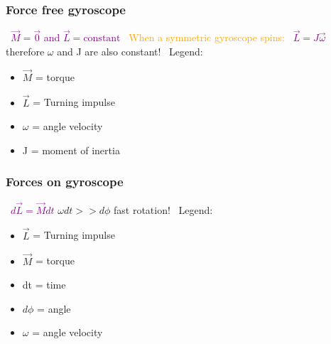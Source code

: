 \documentclass[main.tex,fontsize=8pt,paper=a4,paper=portrait,DIV=calc,]{scrartcl}
\begin{document}
\begin{multicols*}{2}
\subsubsection{Force free gyroscope}
\, \newline
\large \textcolor{purple}{\( \vec{M} = \vec{0} \) and \( \vec{L} = \text{constant} \)}\newline
\, \newline
\large \textcolor{orange}{When a symmetric gyroscope spins:}
\, \newline
\large \textcolor{purple}{\( \vec{L} = J\vec{\omega} \)}\newline
therefore \(\omega\) and J are also constant!\newline
\, \newline
\normalsize Legend: \newline
\begin{itemize}
  \item \(\vec{M}\) = torque
  \item \(\vec{L}\) = Turning impulse
\item \(\omega\) = angle velocity 
\item J = moment of inertia
\end{itemize} 

\subsubsection{Forces on gyroscope}
\, \newline
\large \textcolor{purple}{\( d\vec{L} = \vec{M}dt \)}\newline
\(\omega dt >> d\phi\) fast rotation!\newline
\, \newline
\normalsize Legend: \newline
\begin{itemize}
  \item \(\vec{L}\) = Turning impulse
  \item \(\vec{M}\) = torque
\item dt = time  
\item \(d\phi\) = angle 
\item \(\omega\) = angle velocity
\end{itemize} 


\end{multicols*}
\end{document}

